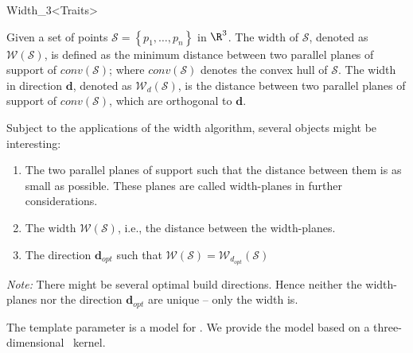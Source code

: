 
\begin{ccRefClass}{Width_3<Traits>}


\ccSaveThreeColumns

\ccDefinition

Given a set of points $\mathcal{S}=\left\{p_1,\ldots , p_n\right\}$ in
$\R^3$. The width of $\mathcal{S}$, denoted as $\mathcal{W(S)}$, is defined
as the minimum distance between two parallel planes of support of
$\mathit{conv(\mathcal{S})}$; where $\mathit{conv(\mathcal{S})}$ denotes
the convex hull of $\mathcal{S}$. The width in direction $\mathbf{d}$,
denoted as $\mathcal{W}_d\mathcal{(S)}$, is the distance between two
parallel planes of support of $\mathit{conv(\mathcal{S})}$, which are
orthogonal to $\mathbf{d}$.

Subject to the applications of the width algorithm, several objects
might be interesting: 
\begin{enumerate}
\item The two parallel planes of support such that the distance
  between them is as small as possible. These planes are called
  width-planes in further considerations.
\item The width $\mathcal{W(S)}$, i.e., the distance between the
  width-planes.
\item The direction $\mathbf{d}_{opt}$ such that
  $\mathcal{W(S)}=\mathcal{W}_{d_{opt}}\mathcal{(S)}$
\end{enumerate}

\emph{Note:} There might be several optimal build directions. Hence
neither the width-planes nor the direction $\mathbf{d}_{opt}$ are
unique -- only the width is.


\ccIndexRequirements

The template parameter  is a model for .
We provide the model  based on a
three-dimensional \cgal~kernel.

\ccTypes
\ccIndexClassTypes


\end{ccRefClass}
